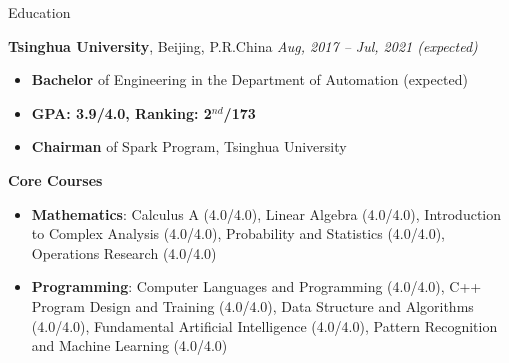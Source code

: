 \documentclass{resume} %
\begin{document}

\begin{rSection}{Education}

{\textbf{Tsinghua University}, Beijing, P.R.China} \hfill {\em Aug, 2017 -- Jul, 2021 (expected)}
\begin{itemize}
    \item \textbf{Bachelor} of Engineering in the Department of Automation (expected)
    \item \textbf{GPA: 3.9/4.0, Ranking: 2$^{nd}$/173}
    \item \textbf{Chairman} of Spark Program, Tsinghua University
\end{itemize}

\textbf{Core Courses}
\begin{spacing}{1.05}
\begin{itemize}
    \item \textbf{Mathematics}: Calculus A (4.0/4.0), 
    Linear Algebra (4.0/4.0), 
    Introduction to Complex Analysis (4.0/4.0), 
    Probability and Statistics (4.0/4.0), 
    Operations Research (4.0/4.0)
    \item \textbf{Programming}: Computer Languages and Programming (4.0/4.0), 
    C++ Program Design and Training (4.0/4.0), 
    Data Structure and Algorithms (4.0/4.0), 
    Fundamental Artificial Intelligence (4.0/4.0), 
    Pattern Recognition and Machine Learning (4.0/4.0)
\end{itemize}
\end{spacing}

\end{rSection}
\end{document}

